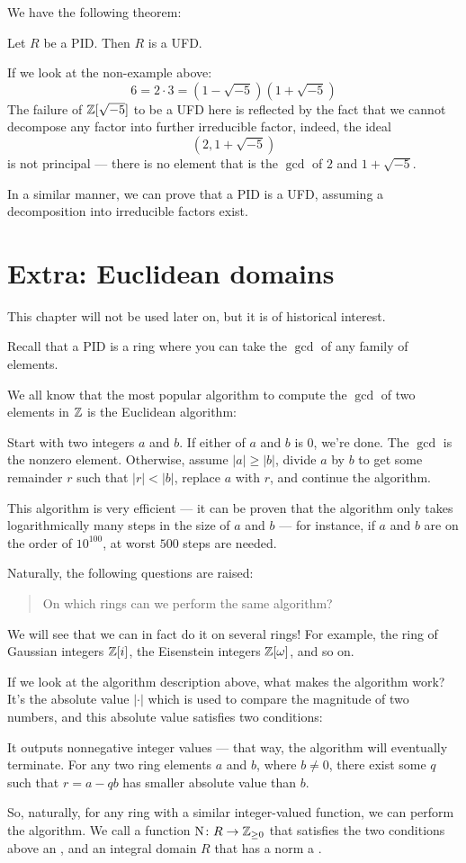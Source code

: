 We have the following theorem:
\begin{theorem}
	Let $R$ be a PID. Then $R$ is a UFD.
\end{theorem}

If we look at the non-example above:
\[ 6 = 2 \cdot 3 = \left( 1-\sqrt{-5} \right) \left( 1+\sqrt{-5} \right) \]
The failure of $\mathbb Z[\sqrt{-5}]$ to be a UFD here is reflected by the fact that we cannot decompose
any factor into further irreducible factor, indeed, the ideal
\[ \left( 2, 1 + \sqrt{-5} \right) \]
is not principal --- there is no element that is the $\gcd$ of $2$ and $1 + \sqrt{-5}$.

In a similar manner, we can prove that a PID is a UFD, assuming a decomposition into irreducible
factors exist.

\section{Extra: Euclidean domains}

This chapter will not be used later on, but it is of historical interest.

Recall that a PID is a ring where you can take the $\gcd$ of any family of elements.

We all know that the most popular algorithm to compute the $\gcd$ of two elements in $\mathbb Z$ is the
Euclidean algorithm:
\begin{itemize}
	\ii Start with two integers $a$ and $b$.
	\ii If either of $a$ and $b$ is $0$, we're done. The $\gcd$ is the nonzero element.
	\ii Otherwise, assume $|a| \geq |b|$, divide $a$ by $b$ to get some remainder $r$ such that
	$|r| < |b|$, replace $a$ with $r$, and continue the algorithm.
\end{itemize}
This algorithm is very efficient --- it can be proven that the algorithm only takes logarithmically
many steps in the size of $a$ and $b$ --- for instance, if $a$ and $b$ are on the order of
$10^{100}$, at worst $500$ steps are needed.

Naturally, the following questions are raised:
\begin{quote}
	On which rings can we perform the same algorithm?
\end{quote}
We will see that we can in fact do it on several rings! For example, the ring of Gaussian integers
$\mathbb Z[i]$, the Eisenstein integers $\mathbb Z[\omega]$, and so on.

If we look at the algorithm description above, what makes the algorithm work?
It's the absolute value $|\cdot|$ which is used to compare the magnitude of two numbers,
and this absolute value satisfies two conditions:
\begin{itemize}
	\ii It outputs nonnegative integer values --- that way, the algorithm will eventually terminate.
	\ii For any two ring elements $a$ and $b$, where $b \neq 0$, there exist some $q$ such that
	$r = a-qb$ has smaller absolute value than $b$.
\end{itemize}
So, naturally, for any ring with a similar integer-valued function, we can perform the algorithm.
We call a function $\operatorname{N} \colon R \to \mathbb Z_{\geq 0}$ that satisfies the two conditions above an
, and an integral domain $R$ that has a norm a .

